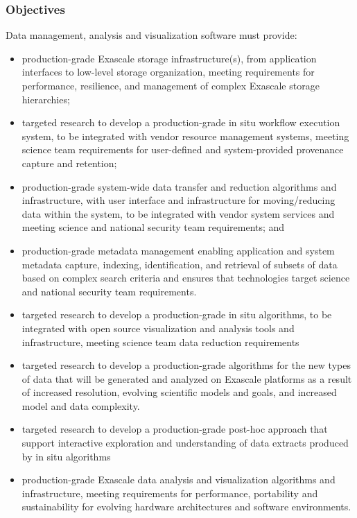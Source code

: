 \subsubsection{Objectives}
Data management, analysis and visualization software must provide:
\begin{itemize}
\item production-grade Exascale storage infrastructure(s), from application interfaces to low-level storage organization, meeting requirements for performance, resilience, and management of complex Exascale storage hierarchies;
\item targeted research to develop a production-grade in situ workflow execution system, to be integrated with vendor resource management systems, meeting science team requirements for user-defined and system-provided provenance capture and retention;
\item production-grade system-wide data transfer and reduction algorithms and infrastructure, with user interface and infrastructure for moving/reducing data within the system, to be integrated with vendor system services and meeting science and national security team requirements; and
\item production-grade metadata management enabling application and system metadata capture, indexing, identification, and retrieval of subsets of data based on complex search criteria and ensures that technologies target science and national security team requirements.
\item targeted research to develop a production-grade in situ algorithms, to be integrated with open source visualization and analysis tools and infrastructure, meeting science team data reduction requirements
\item targeted research to develop a production-grade algorithms for the new types of data that will be generated and analyzed on Exascale platforms as a result of increased resolution, evolving scientific models and goals, and increased model and data complexity.
\item targeted research to develop a production-grade post-hoc approach that support interactive exploration and understanding of data extracts produced by in situ algorithms
\item production-grade Exascale data analysis and visualization algorithms and infrastructure, meeting requirements for performance, portability and sustainability for evolving hardware architectures and software environments. 
\end{itemize}

